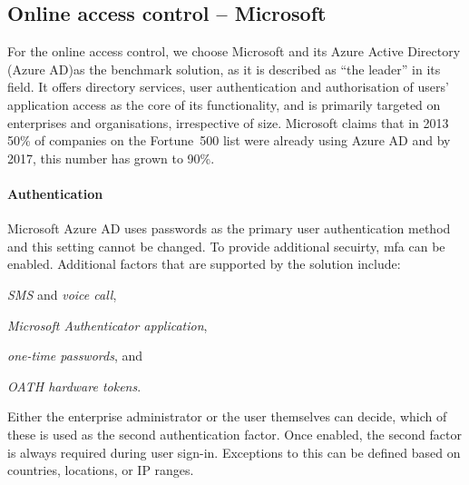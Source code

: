 \subsection{Online access control -- Microsoft}

For the online access control, we choose Microsoft and its Azure Active Directory (Azure AD)\footnotemark as the benchmark solution, as it is described as ``the leader'' in its field.
It offers directory services, user authentication and authorisation of users' application access as the core of its functionality, and is primarily targeted on enterprises and organisations, irrespective of size. Microsoft claims that in 2013 50\% of companies on the Fortune~500 list were already using Azure AD and by 2017, this number has grown to 90\%.


\paragraph{Authentication} Microsoft Azure AD uses passwords as the primary user authentication method and this setting cannot be changed.
To provide additional secuirty, \acrlong{mfa} can be enabled. Additional factors that are supported by the solution include:
\begin{enumerate*}[label=(\roman*)]
    \item \textit{SMS} and \textit{voice call},
    \item \textit{Microsoft Authenticator application},
    \item \textit{one-time passwords}, and 
    \item \textit{OATH hardware tokens}\footnotemark.
\end{enumerate*}

Either the enterprise administrator or the user themselves can decide, which of these is used as the second authentication factor. Once enabled, the second factor is always required during user sign-in. Exceptions to this can be defined based on countries, locations, or IP ranges.

